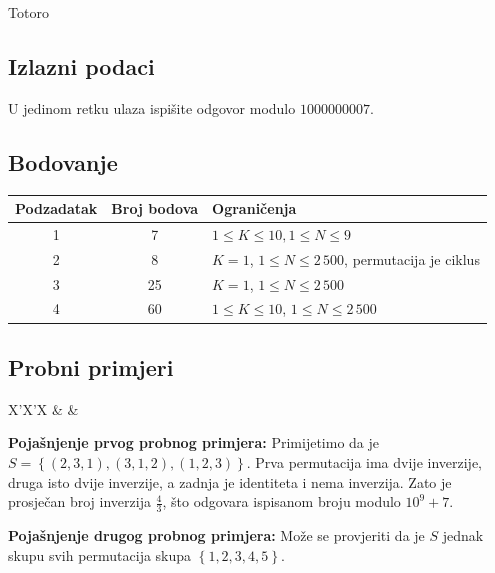 \begin{statement}[
  problempoints=100,
  timelimit=1 sekunda,
  memorylimit=512 MiB,
]{Totoro}
\subsection*{Izlazni podaci}
U jedinom retku ulaza ispišite odgovor modulo $1 000 000 007$. 

\subsection*{Bodovanje}
{\renewcommand{\arraystretch}{1.4}
  \setlength{\tabcolsep}{6pt}
  \begin{tabular}{ccl}
 Podzadatak & Broj bodova & Ograničenja \\ \midrule
  1 & 7 & $ 1 \le K \le 10, 1 \le N \le 9$ \\
  2 & 8 & $ K = 1 $, $1 \le N \le 2\,500$, permutacija je ciklus \\
  3 & 25 & $ K = 1$, $1 \le N \le 2\,500$ \\
  4 & 60 & $1 \le K \le 10$, $1 \le N \le 2\,500$ \\
\end{tabular}}
\clearpage
\subsection*{Probni primjeri}
\begin{tabularx}{\textwidth}{X'X'X}
 &
 &
\end{tabularx}

\textbf{Pojašnjenje prvog probnog primjera:}
Primijetimo da je $S = \left\{ (2, 3, 1), (3, 1, 2), (1, 2, 3)\right\}$.
Prva permutacija ima dvije inverzije, druga isto dvije inverzije, a zadnja
je identiteta i nema inverzija. Zato je prosječan broj inverzija $\frac{4}{3}$,
što odgovara ispisanom broju modulo $10^9 + 7$.

\textbf{Pojašnjenje drugog probnog primjera:}
Može se provjeriti da je $S$ jednak skupu svih permutacija skupa 
$\left\{1, 2, 3, 4, 5 \right\}$. 

\end{statement}

